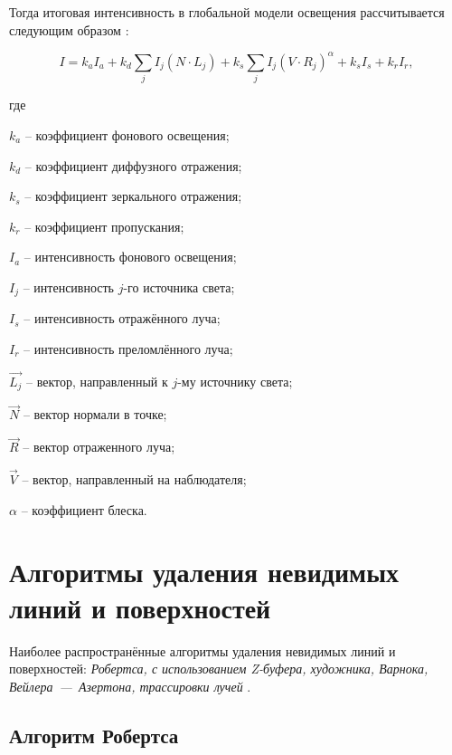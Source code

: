 Тогда итоговая интенсивность в глобальной модели освещения рассчитывается следующим образом \cite{tomsk_2011}:

\begin{equation}
	I = k_aI_a + k_d\sum\limits_{j}^{}I_j(N \cdot L_j) + k_s\sum\limits_{j}^{}I_j(V \cdot R_j)^{\alpha} + k_sI_s + k_rI_r,
\end{equation}

где

    $k_a$ -- коэффициент фонового освещения;
    
    $k_d$ -- коэффициент диффузного отражения;
    
    $k_s$ -- коэффициент зеркального отражения;
    
    $k_r$ -- коэффициент пропускания;
    
    $I_a$ -- интенсивность фонового освещения;
    
    $I_j$ -- интенсивность $j$-го источника света;
    
    $I_s$ -- интенсивность отражённого луча;
    
    $I_r$ -- интенсивность преломлённого луча;
    
    $\vec{L_j}$ -- вектор, направленный к $j$-му источнику света;
    
    $\vec{N}$ -- вектор нормали в точке;
    
    $\vec{R}$ -- вектор отраженного луча;
    
    $\vec{V}$ -- вектор, направленный на наблюдателя;
    
    $\alpha$ -- коэффициент блеска.

\clearpage

\section{Алгоритмы удаления невидимых линий и поверхностей}

Наиболее распространённые алгоритмы удаления невидимых линий и поверхностей: \textit{Робертса, с использованием Z-буфера, художника, Варнока, Вейлера~---~Азертона, трассировки лучей} \cite{devaifuture, warnock1969hidden, foley1996computer, кутенев2019разработка, половинина2018исследование, головнин2016базовые, tomsk_2011}.


\subsection{Алгоритм Робертса}

